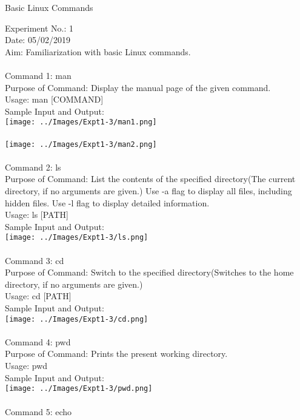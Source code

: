 \documentclass[10pt,a4paper]{report}
\begin{document}
\begin{center}
\begin{Large}
Basic Linux Commands
\end{Large}
\end{center}
Experiment No.: 1\\
Date: 05/02/2019\\
Aim: Familiarization with basic Linux commands.\\
\\
Command 1: man\\
Purpose of Command: Display the manual page of the given command.\\
Usage: man [COMMAND]\\
Sample Input and Output: \\	
\texttt{[image: ../Images/Expt1-3/man1.png]}\\
\\
\texttt{[image: ../Images/Expt1-3/man2.png]}\\
\\
Command 2: ls\\
Purpose of Command: List the contents of the specified directory(The current directory, if no arguments are given.) Use -a flag to display all files, including hidden files. Use -l flag to display detailed information.\\
Usage: ls [PATH]\\
Sample Input and Output: \\
\texttt{[image: ../Images/Expt1-3/ls.png]}\\
\pagebreak
\\
Command 3: cd\\
Purpose of Command: Switch to the specified directory(Switches to the home directory, if no arguments are given.)\\
Usage: cd [PATH]\\
Sample Input and Output: \\
\texttt{[image: ../Images/Expt1-3/cd.png]}\\
\\
Command 4: pwd\\
Purpose of Command: Prints the present working directory.\\
Usage: pwd\\
Sample Input and Output: \\
\texttt{[image: ../Images/Expt1-3/pwd.png]}\\
\\
Command 5: echo\\
\end{document}
